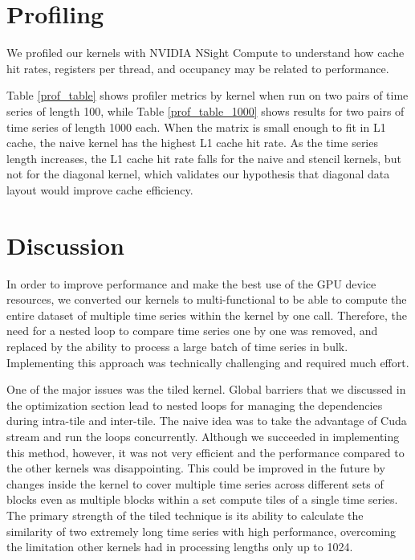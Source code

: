 \documentclass[12pt, letterpaper]{article}
\begin{document}


\FloatBarrier
\section{Profiling}

We profiled our kernels with NVIDIA NSight Compute to understand how cache hit
rates, registers per thread, and occupancy may be related to performance.

Table \ref{prof_table} shows profiler metrics by kernel when run on two pairs of
time series of length 100, while Table \ref{prof_table_1000} shows results for
two pairs of time series of length 1000 each. When the matrix is small enough to
fit in L1 cache, the naive kernel has the highest L1 cache hit rate. As the time
series length increases, the L1 cache hit rate falls for the naive and stencil
kernels, but not for the diagonal kernel, which validates our hypothesis that
diagonal data layout would improve cache efficiency.





\FloatBarrier
\section{Discussion}

In order to improve performance and make the best use of the GPU device
resources, we converted our kernels to multi-functional to be able to compute
the entire dataset of multiple time series within the kernel by one call.
Therefore, the need for a nested loop to compare time series one by one was
removed, and replaced by the ability to process a large batch of time series in
bulk. Implementing this approach was technically challenging and required much
effort.

One of the major issues was the tiled kernel. Global barriers that we discussed
in the optimization section lead to nested loops for managing the dependencies
during intra-tile and inter-tile. The naive idea was to take the advantage of
Cuda stream and run the loops concurrently. Although we succeeded in
implementing this method, however, it was not very efficient and the performance
compared to the other kernels was disappointing. This could be improved in the
future by changes inside the kernel to cover multiple time series across
different sets of blocks even as multiple blocks within a set compute tiles of a
single time series. The primary strength of the tiled technique is its ability
to calculate the similarity of two extremely long time series with high
performance, overcoming the limitation other kernels had in processing lengths
only up to 1024.
\end{document}
